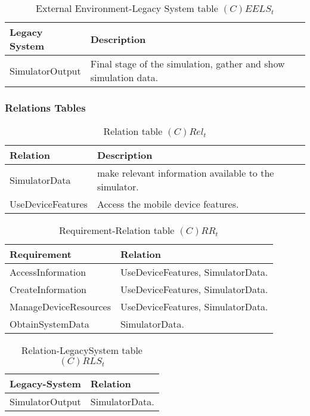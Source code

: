 \begin{table}[H]
	\centering
	\begin{tabular}{|p{4cm}|p{8cm}|}
			\hline
			\textbf{Legacy System} & \textbf{Description} \\
			\hline
			SimulatorOutput & Final stage of the simulation, gather and show simulation data. \\
			\hline
		\end{tabular}
	\caption{External Environment-Legacy System table $(C)EELS_t$}
	\label{tab:ceelst}
\end{table}

\subsubsection*{Relations Tables}

\begin{table}[H]
	\centering
	\begin{tabular}{|p{4cm}|p{8cm}|}
			\hline
			\textbf{Relation} & \textbf{Description} \\
			\hline
			SimulatorData & make relevant information available to the simulator. \\
			\hline
			UseDeviceFeatures & Access the mobile device features. \\
			\hline
		\end{tabular}
	\caption{Relation table $(C)Rel_t$}
	\label{tab:crelt}
\end{table}

\begin{table}[H]
	\centering
	\begin{tabular}{|p{4cm}|p{8cm}|}
			\hline
			\textbf{Requirement} & \textbf{Relation} \\
			\hline
			AccessInformation & UseDeviceFeatures, SimulatorData. \\
			\hline
			CreateInformation & UseDeviceFeatures, SimulatorData. \\
			\hline
			ManageDeviceResources & UseDeviceFeatures, SimulatorData. \\
			\hline
			ObtainSystemData & SimulatorData. \\
			\hline
		\end{tabular}
	\caption{Requirement-Relation table $(C)RR_t$}
	\label{tab:crrt}
\end{table}

\begin{table}[H]
	\centering
	\begin{tabular}{|p{4cm}|p{8cm}|}
			\hline
			\textbf{Legacy-System} & \textbf{Relation} \\
			\hline
			SimulatorOutput & SimulatorData. \\
			\hline
		\end{tabular}
	\caption{Relation-LegacySystem table $(C)RLS_t$}
	\label{tab:crlst}
\end{table}


